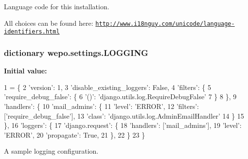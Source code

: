 Language code for this installation. 

All choices can be found here\-: \href{http://www.i18nguy.com/unicode/language-identifiers.html}{\tt http\-://www.\-i18nguy.\-com/unicode/language-\/identifiers.\-html} \hypertarget{namespacewepo_1_1settings_a256be23609f64ad17ec9446d46007d8e}{
\subsubsection[{L\-O\-G\-G\-I\-N\-G}]{\setlength{\rightskip}{0pt plus 5cm}dictionary wepo.\-settings.\-L\-O\-G\-G\-I\-N\-G}}\label{namespacewepo_1_1settings_a256be23609f64ad17ec9446d46007d8e}
{\bfseries Initial value\-:}
\begin{DoxyCode}
1 = \{
2    \textcolor{stringliteral}{'version'}: 1,
3    \textcolor{stringliteral}{'disable\_existing\_loggers'}: \textcolor{keyword}{False},
4    \textcolor{stringliteral}{'filters'}: \{
5       \textcolor{stringliteral}{'require\_debug\_false'}: \{
6          \textcolor{stringliteral}{'()'}: \textcolor{stringliteral}{'django.utils.log.RequireDebugFalse'}
7       \}
8    \},
9    \textcolor{stringliteral}{'handlers'}: \{
10       \textcolor{stringliteral}{'mail\_admins'}: \{
11          \textcolor{stringliteral}{'level'}: \textcolor{stringliteral}{'ERROR'},
12          \textcolor{stringliteral}{'filters'}: [\textcolor{stringliteral}{'require\_debug\_false'}],
13          \textcolor{stringliteral}{'class'}: \textcolor{stringliteral}{'django.utils.log.AdminEmailHandler'}
14       \}
15    \},
16    \textcolor{stringliteral}{'loggers'}: \{
17       \textcolor{stringliteral}{'django.request'}: \{
18          \textcolor{stringliteral}{'handlers'}: [\textcolor{stringliteral}{'mail\_admins'}],
19          \textcolor{stringliteral}{'level'}: \textcolor{stringliteral}{'ERROR'},
20          \textcolor{stringliteral}{'propagate'}: \textcolor{keyword}{True},
21       \},
22    \}
23 \}
\end{DoxyCode}


A sample logging configuration. 

